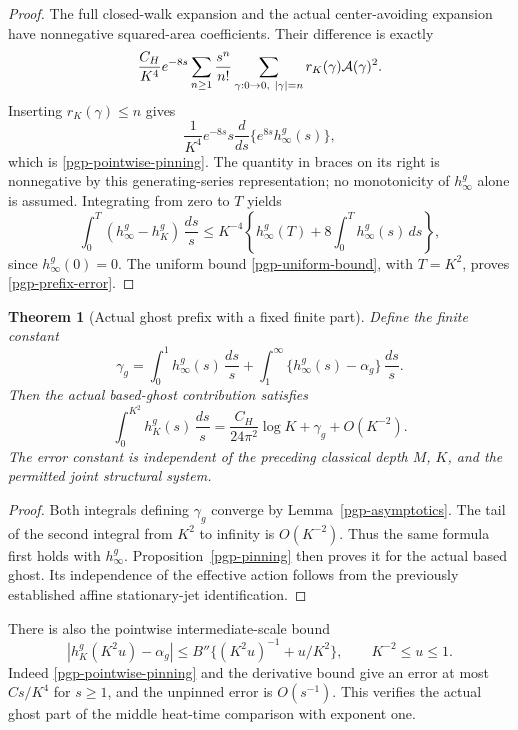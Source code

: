 \documentclass[11pt]{article}
\newtheorem{theorem}{Theorem}[section]
\theoremstyle{remark}
\begin{document}
\begin{proof}
The full closed-walk expansion and the actual
center-avoiding expansion have nonnegative squared-area
coefficients. Their difference is exactly
\[
 \frac{C_H}{K^4}e^{-8s}
   \sum_{n\ge1}\frac{s^n}{n!}
       \sum_{\gamma:0\to0,\ |\gamma|=n}
                         r_K(\gamma){\cal A}(\gamma)^2 .
\]
Inserting \(r_K(\gamma)\le n\) gives
\[
 \frac1{K^4}e^{-8s}
           s\frac{d}{ds}\{e^{8s}h_\infty^g(s)\},
\]
which is \eqref{pgp-pointwise-pinning}. The quantity
in braces on its right is nonnegative by this
generating-series representation; no monotonicity
of \(h_\infty^g\) alone is assumed.
Integrating from zero to \(T\) yields
\[
 \int_0^T(h_\infty^g-h_K^g)\,\frac{ds}{s}
 \le K^{-4}\left\{h_\infty^g(T)
                       +8\int_0^T h_\infty^g(s)\,ds\right\},
\]
since \(h_\infty^g(0)=0\).
The uniform bound \eqref{pgp-uniform-bound}, with
\(T=K^2\), proves \eqref{pgp-prefix-error}.
\end{proof}

\begin{theorem}[Actual ghost prefix with a fixed finite part]
\label{pgp-prefix-theorem}
Define the finite constant
\[
 \gamma_g=\int_0^1 h_\infty^g(s)\,\frac{ds}{s}
       +\int_1^\infty\{h_\infty^g(s)-\alpha_g\}\,\frac{ds}{s}.
\]
Then the actual based-ghost contribution satisfies
\begin{equation}
 \boxed{\quad
 \int_0^{K^2}h_K^g(s)\,\frac{ds}{s}
     =\frac{C_H}{24\pi^2}\log K+\gamma_g+O(K^{-2}).
 \quad}
 \label{pgp-prefix-law}
\end{equation}
The error constant is independent of the preceding
classical depth \(M\), \(K\), and the permitted joint
structural system.
\end{theorem}

\begin{proof}
Both integrals defining \(\gamma_g\) converge by
Lemma~\ref{pgp-asymptotics}. The tail of the second
integral from \(K^2\) to infinity is \(O(K^{-2})\).
Thus the same formula first holds with \(h_\infty^g\).
Proposition~\ref{pgp-pinning} then proves it for the
actual based ghost. Its independence of the effective
action follows from the previously established
affine stationary-jet identification.
\end{proof}

There is also the pointwise intermediate-scale bound
\begin{equation}
 \left|h_K^g(K^2u)-\alpha_g\right|
 \le B''\{(K^2u)^{-1}+u/K^2\},
                         \qquad K^{-2}\le u\le1.
 \label{pgp-band-bound}
\end{equation}
Indeed \eqref{pgp-pointwise-pinning} and the derivative
bound give an error at most \(Cs/K^4\) for \(s\ge1\),
and the unpinned error is \(O(s^{-1})\).
This verifies the actual ghost part of the middle
heat-time comparison with exponent one.
\end{document}
